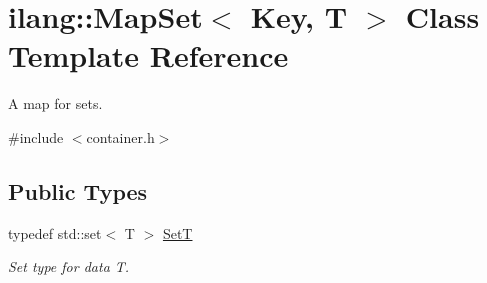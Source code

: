 \hypertarget{classilang_1_1_map_set}{}\section{ilang\+:\+:Map\+Set$<$ Key, T $>$ Class Template Reference}
\label{classilang_1_1_map_set}


A map for sets.  




{\ttfamily \#include $<$container.\+h$>$}

\subsection*{Public Types}
\begin{DoxyCompactItemize}
\item 
\mbox{\label{classilang_1_1_map_set_aeefa483aff031c9185145739fef0f6e7}} 
typedef std\+::set$<$ T $>$ \mbox{\hyperlink{classilang_1_1_map_set_aeefa483aff031c9185145739fef0f6e7}{SetT}}
\begin{DoxyCompactList}\small\item\em Set type for data T. \end{DoxyCompactList}\end{DoxyCompactItemize}
